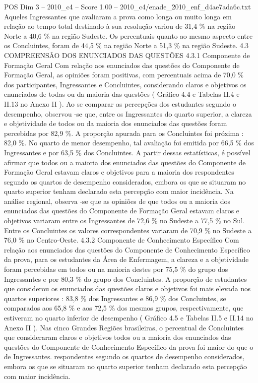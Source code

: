 \begin{textsample}{POS Dim 3 – 2010\_c4 – Score 1.00 – 2010\_c4/enade\_2010\_enf\_d4ae7ada6c.txt}
Aqueles Ingressantes que avaliaram a prova como longa ou muito longa em relação ao tempo total destinado à sua resolução variou de 31,4 \% na região Norte a 40,6 \% na região Sudeste.
Os percentuais quanto ao mesmo aspecto entre os Concluintes, foram de 44,5 \% na região Norte a 51,3 \% na região Sudeste. 4.3 COMPREENSÃO DOS ENUNCIADOS DAS QUESTÕES 4.3.1 Componente de Formação Geral Com relação aos enunciados das questões do Componente de Formação Geral, as opiniões foram positivas, com percentuais acima de 70,0 \% dos participantes, Ingressantes e Concluintes, considerando claros e objetivos os enunciados de todas ou da maioria das questões ( Gráfico 4.4 e Tabelas II.4 e II.13 no Anexo II ).
Ao se comparar as percepções dos estudantes segundo o desempenho, observou -se que, entre os Ingressantes do quarto superior, a clareza e objetividade de todos ou da maioria dos enunciados das questões foram percebidas por 82,9 \%.
A proporção apurada para os Concluintes foi próxima : 82,0 \%.
No quarto de menor desempenho, tal avaliação foi emitida por 66,5 \% dos Ingressantes e por 63,5 \% dos Concluintes.
A partir dessas estatísticas, é possível afirmar que todos ou a maioria dos enunciados das questões do Componente de Formação Geral estavam claros e objetivos para a maioria dos respondentes segundo os quartos de desempenho considerados, embora os que se situaram no quarto superior tenham declarado esta percepção com maior incidência.
Na análise regional, observa -se que as opiniões de que todos ou a maioria dos enunciados das questões do Componente de Formação Geral estavam claros e objetivos variaram entre os Ingressantes de 72,6 \% no Sudeste a 77,5 \% no Sul.
Entre os Concluintes os valores correspondentes variaram de 70,9 \% no Sudeste a 76,0 \% no Centro-Oeste. 4.3.2 Componente de Conhecimento Específico Com relação aos enunciados das questões do Componente de Conhecimento Específico da prova, para os estudantes da Área de Enfermagem, a clareza e a objetividade foram percebidas em todos ou na maioria destes por 75,5 \% do grupo dos Ingressantes e por 80,3 \% do grupo dos Concluintes.
A proporção de estudantes que considerou os enunciados das questões claros e objetivos foi mais elevada nos quartos superiores : 83,8 \% dos Ingressantes e 86,9 \% dos Concluintes, se comparados aos 65,8 \% e aos 72,5 \% dos mesmos grupos, respectivamente, que estiveram no quarto inferior de desempenho ( Gráfico 4.5 e Tabelas II.5 e II.14 no Anexo II ).
Nas cinco Grandes Regiões brasileiras, o percentual de Concluintes que consideraram claros e objetivos todos ou a maioria dos enunciados das questões do Componente de Conhecimento Específico da prova foi maior do que o de Ingressantes. respondentes segundo os quartos de desempenho considerados, embora os que se situaram no quarto superior tenham declarado esta percepção com maior incidência.

\end{textsample}
